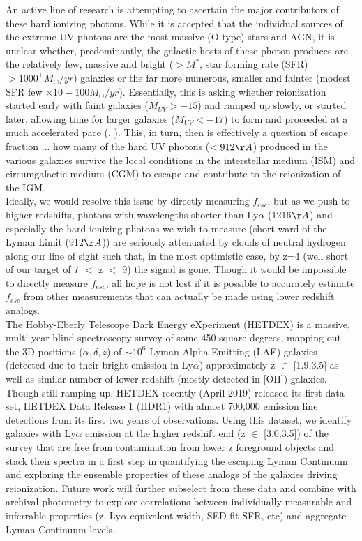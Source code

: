 \documentclass{aastex62}
\begin{document}
An active line of research is attempting to ascertain the major contributors of these hard ionizing photons. While it is accepted that the individual sources of the extreme UV photons are the most massive (O-type) stars and AGN, it is unclear whether, predominantly, the galactic hosts of these photon produces are the relatively few, massive and bright ($> M^{*}$, star forming rate (SFR) $> 1000^{+} M_{\odot}/yr$) galaxies or the far more numerous, smaller and fainter (modest SFR few $\times 10 - 100 M_{\odot}/yr$). Essentially, this is asking whether reionization started early with faint galaxies ($M_{UV} > -15$) and ramped up slowly, or started later, allowing time for larger galaxies ($M_{UV} < -17$) to form and proceeded at a much accelerated pace (\cite{Livermore}, \cite{Finkelstein}). This, in turn, then is effectively a question of escape fraction ... how many of the hard UV photons ($< 912\AA$) produced in the various galaxies survive the local conditions in the interstellar medium (ISM) and circumgalactic medium (CGM) to escape and contribute to the reionization of the IGM.\\


Ideally, we would resolve this issue by directly measuring $f_{esc}$, but as we push to higher redshifts, photons with wavelengths shorter than Ly$\alpha$ (1216$\AA$) and especially the hard ionizing photons we wish to measure (short-ward of the Lyman Limit (912$\AA$)) are seriously attenuated by clouds of neutral hydrogen along our line of sight such that, in the most optimistic case, by z=4 (well short of our target of 7 $<$ z $<$ 9) the signal is gone. Though it would be impossible to directly measure $f_{esc}$, all hope is not lost if it is possible to accurately estimate $f_{esc}$ from other measurements that can actually be made using lower redshift analogs.\\


The Hobby-Eberly Telescope Dark Energy eXperiment (HETDEX) is a massive, multi-year blind spectroscopy survey of some 450 square degrees, mapping out the 3D positions ($\alpha,\delta,z$) of $\sim 10^6$ Lyman Alpha Emitting (LAE) galaxies (detected due to their bright emission in Ly$\alpha$) approximately z $\in$ [1.9,3.5] as well as similar number of lower redshift (mostly detected in [OII]) galaxies. Though still ramping up, HETDEX recently (April 2019) released its first data set, HETDEX Data Release 1 (HDR1) with almost 700,000 emission line detections from its first two years of observations. Using this dataset, we identify galaxies with Ly$\alpha$ emission at the higher redshift end (z $\in$ [3.0,3.5]) of the survey that are free from contamination from lower z foreground objects and stack their spectra in a first step in quantifying the escaping Lyman Continuum and exploring the ensemble properties of these analogs of the galaxies driving reionization. Future work will further subselect from these data and combine with archival photometry to explore correlations between individually measurable and inferrable properties (z, Ly$\alpha$ equivalent width, SED fit SFR, etc) and aggregate Lyman Continuum levels.\\
\end{document}
